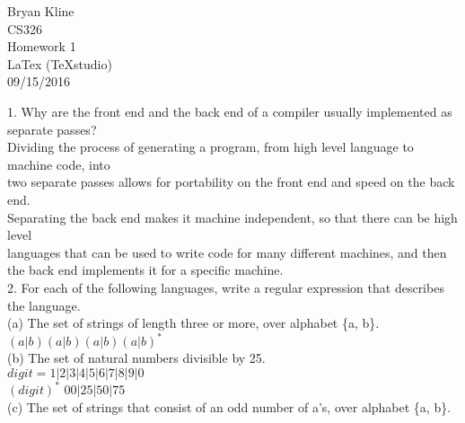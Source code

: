 \documentclass[12pt]{article}
\begin{document}
\begin{center}

\Huge
Bryan Kline\\
[10mm]
CS326\\ 
[10mm]
Homework 1\\
\small LaTex (TeXstudio)\\
[10mm]
\Huge
09/15/2016\\
[200mm]

\end{center}

\begin{flushleft}
1. Why  are  the  front  end  and  the  back end  of  a  compiler  usually  implemented  as separate passes?\\
[2mm]

\qquad \qquad 
Dividing the process of generating a program, from high level language to machine code, into\\ 
\qquad \qquad 
two separate passes allows for portability on the front end and speed on the back end.\\
\qquad \qquad 
Separating the back end makes it machine independent, so that there can be high level\\ 
\qquad \qquad 
languages that can be used to write code for many different machines, and then\\
\qquad \qquad 
the back end implements it for a specific machine.\\ 
[2mm]

2. For  each  of  the  following  languages, write  a  regular  expression  that  describes the language.\\
[2mm]

\qquad \qquad (a) The set of strings of length three or more, over alphabet \{a, b\}.\\    	
[2mm]

\qquad \qquad \qquad
$(a\big|b)(a\big|b)(a\big|b)(a\big|b)^*$\\
[4mm]

\qquad \qquad (b) The set of natural numbers divisible by 25.\\   	
[2mm]

\qquad \qquad \qquad
$digit = {1\big|2\big|3\big|4\big|5\big|6\big|7\big|8\big|9\big|0}$\\ 
\qquad \qquad \qquad
$(digit)^*$ $00\big|25\big|50\big|75$\\
[4mm]

\qquad \qquad (c) The set of strings that consist of an odd number of a’s, over alphabet \{a, b\}.\\ 	
[2mm]


\end{flushleft}
\end{document}

